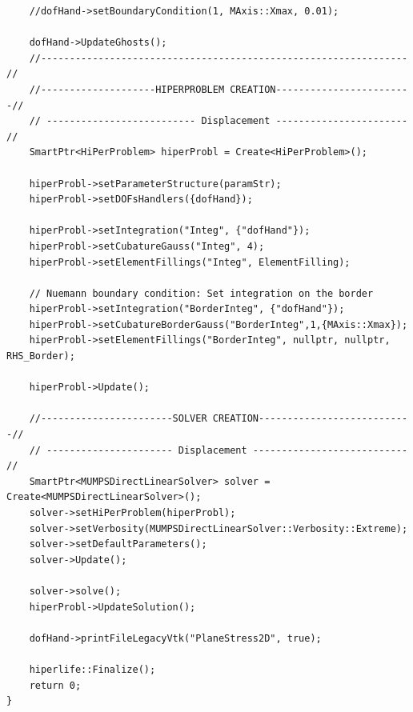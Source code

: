 \documentclass[]{article}
\begin{document}
\begin{lstlisting}
	//dofHand->setBoundaryCondition(1, MAxis::Xmax, 0.01);
	
	dofHand->UpdateGhosts();
	//---------------------------------------------------------------- //
	//--------------------HIPERPROBLEM CREATION------------------------//
	// -------------------------- Displacement ----------------------- //
	SmartPtr<HiPerProblem> hiperProbl = Create<HiPerProblem>();
	
	hiperProbl->setParameterStructure(paramStr);
	hiperProbl->setDOFsHandlers({dofHand});
	
	hiperProbl->setIntegration("Integ", {"dofHand"});
	hiperProbl->setCubatureGauss("Integ", 4);
	hiperProbl->setElementFillings("Integ", ElementFilling);
	
	// Nuemann boundary condition: Set integration on the border
	hiperProbl->setIntegration("BorderInteg", {"dofHand"});
	hiperProbl->setCubatureBorderGauss("BorderInteg",1,{MAxis::Xmax});
	hiperProbl->setElementFillings("BorderInteg", nullptr, nullptr, RHS_Border);
	
	hiperProbl->Update();
	
	//-----------------------SOLVER CREATION---------------------------//
	// ---------------------- Displacement --------------------------- //
	SmartPtr<MUMPSDirectLinearSolver> solver = Create<MUMPSDirectLinearSolver>();
	solver->setHiPerProblem(hiperProbl);
	solver->setVerbosity(MUMPSDirectLinearSolver::Verbosity::Extreme);
	solver->setDefaultParameters();
	solver->Update();
	
	solver->solve();
	hiperProbl->UpdateSolution();
	
	dofHand->printFileLegacyVtk("PlaneStress2D", true);
	
	hiperlife::Finalize();
	return 0;
}

\end{lstlisting}
\end{document}
